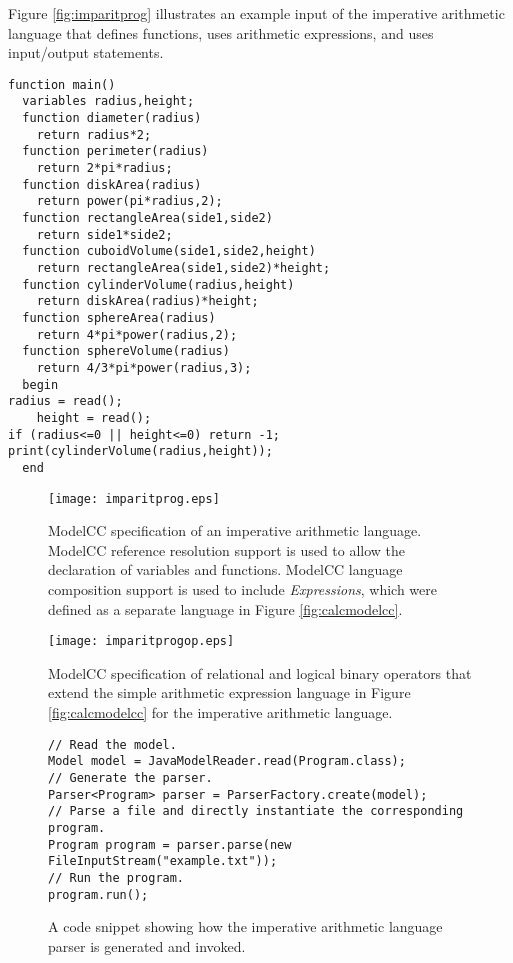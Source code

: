 \documentclass[preprint]{elsarticle}
\begin{document}
Figure \ref{fig:imparitprog} illustrates an example input of the imperative arithmetic language that defines functions, uses arithmetic expressions, and uses input/output statements.

\begin{figure*}[tb!]
\centering
\begin{verbatim}
function main()
  variables radius,height;
  function diameter(radius)
    return radius*2;
  function perimeter(radius)
    return 2*pi*radius;
  function diskArea(radius)
    return power(pi*radius,2);
  function rectangleArea(side1,side2)
    return side1*side2;
  function cuboidVolume(side1,side2,height)
    return rectangleArea(side1,side2)*height;
  function cylinderVolume(radius,height)
    return diskArea(radius)*height;
  function sphereArea(radius)
    return 4*pi*power(radius,2);
  function sphereVolume(radius)
    return 4/3*pi*power(radius,3);
  begin
radius = read();
    height = read();
if (radius<=0 || height<=0) return -1;
print(cylinderVolume(radius,height));
  end
\end{verbatim}
\caption{An example input of the imperative arithmetic language.} \label{fig:imparitprog}
\end{figure*}

\begin{figure}[p]
\centering
\texttt{[image: imparitprog.eps]}
\caption{ModelCC specification of an imperative arithmetic language. ModelCC reference resolution support is used to allow the declaration of variables and functions. ModelCC language composition support is used to include \emph{Expressions}, which were defined as a separate language in Figure \ref{fig:calcmodelcc}.} \label{fig:imparitlang}
\end{figure}

\begin{figure}[tb]
\centering
\texttt{[image: imparitprogop.eps]}
\caption{ModelCC specification of relational and logical binary operators that extend the simple arithmetic expression language in Figure \ref{fig:calcmodelcc} for the imperative arithmetic language.} \label{fig:imparitlangop}
\end{figure}

\begin{figure}[tb]
\begin{verbatim}
// Read the model.
Model model = JavaModelReader.read(Program.class);
// Generate the parser.
Parser<Program> parser = ParserFactory.create(model);
// Parse a file and directly instantiate the corresponding program.
Program program = parser.parse(new FileInputStream("example.txt"));
// Run the program.
program.run();
\end{verbatim}
\caption{A code snippet showing how the imperative arithmetic language parser is generated and invoked.} \label{fig:run2}
\end{figure}
\end{document}
